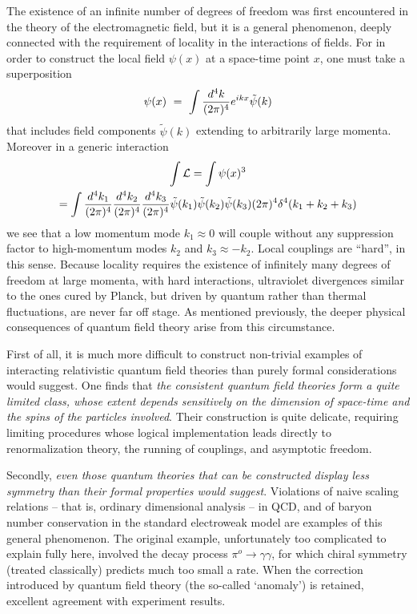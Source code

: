 \documentclass[12pt]{article}
\begin{document}
The existence of an
infinite number of degrees of freedom was first encountered in the
theory of the electromagnetic field, but it is a general phenomenon,
deeply connected with the requirement of locality in the interactions
of fields.  For in order to construct the local field $\psi (x)$ at a
space-time point $x$, one must take a superposition
\begin{equation}
\psi(x) ~=~ \int {d^4k\over (2\pi )^4} e^{ikx} \tilde
\psi (k)
\end{equation}
that includes field components $\tilde \psi (k)$
extending to arbitrarily large momenta.  Moreover in a generic
interaction
\begin{multline}
\int {\cal L} = \int \psi (x)^3 \\
= \int
{d^4k_1\over (2\pi )^4}{d^4k_2\over (2\pi )^4}{d^4k_3 \over (2\pi )^4}
\tilde \psi (k_1) \tilde \psi (k_2) \tilde \psi (k_3) (2\pi
)^4\delta^4(k_1 + k_2 +k_3)
\end{multline}
we see that a low momentum
mode $k_1 \approx 0 $ will couple without any suppression factor to
high-momentum modes $k_2$ and $k_3 \approx -k_2$.  Local couplings are
``hard'', in this sense. Because locality requires the existence
of infinitely many degrees of freedom at large momenta, with hard
interactions, ultraviolet divergences similar to the ones cured by
Planck, but driven by quantum rather than thermal fluctuations, are
never far off stage.  As mentioned previously, the deeper physical
consequences of quantum field theory arise from this circumstance.


First of all, it is much more difficult to construct non-trivial
examples of interacting relativistic quantum field theories than
purely formal considerations would suggest.  One finds that {\it the
consistent quantum field theories form a quite limited class, whose
extent depends sensitively on the dimension of space-time and the
spins of the particles involved}.  Their construction is quite
delicate, requiring limiting procedures whose logical implementation
leads directly to renormalization theory, the running of couplings,
and asymptotic freedom.  

Secondly, {\it even those quantum theories
that can be constructed display less symmetry than their formal
properties would suggest}.  Violations of naive scaling relations --
that is, ordinary dimensional analysis -- in QCD, and of baryon number
conservation in the standard electroweak model are examples of this
general phenomenon.  The original example, unfortunately too
complicated to explain fully here, involved the decay process $\pi^o
\rightarrow \gamma \gamma$, for which chiral symmetry (treated
classically) predicts much too small a rate.  When the correction
introduced by quantum field theory (the so-called `anomaly') is
retained, excellent agreement with experiment results.   
\end{document}
